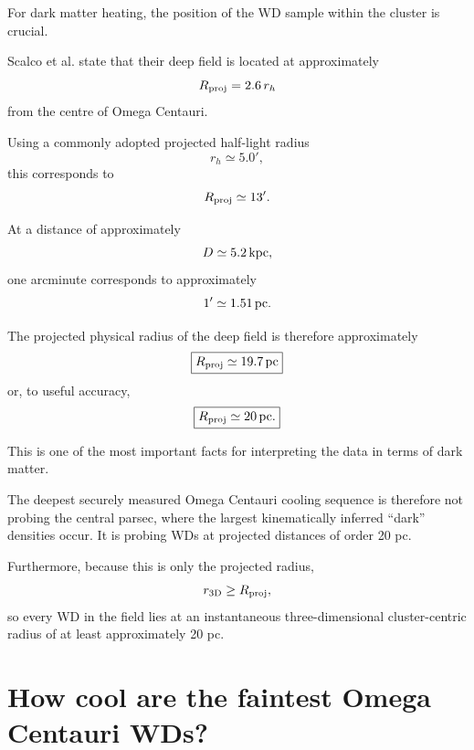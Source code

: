 \documentclass[11pt,a4paper]{article}
\begin{document}
For dark matter heating, the position of the WD sample within the cluster is crucial.

Scalco et al. state that their deep field is located at approximately
\begin{equation}
R_{\rm proj}=2.6\,r_h
\end{equation}
from the centre of Omega Centauri.

Using a commonly adopted projected half-light radius
\begin{equation}
r_h \simeq 5.0',
\end{equation}
this corresponds to
\begin{equation}
R_{\rm proj}\simeq13'.
\end{equation}

At a distance of approximately
\begin{equation}
D\simeq5.2\,{\rm kpc},
\end{equation}
one arcminute corresponds to approximately
\begin{equation}
1' \simeq 1.51\,{\rm pc}.
\end{equation}

The projected physical radius of the deep field is therefore approximately
\begin{equation}
\boxed{
R_{\rm proj}\simeq19.7\,{\rm pc}
}
\end{equation}
or, to useful accuracy,
\begin{equation}
\boxed{
R_{\rm proj}\simeq20\,{\rm pc}.
}
\end{equation}

This is one of the most important facts for interpreting the data in terms of dark matter.

The deepest securely measured Omega Centauri cooling sequence is therefore not probing the central parsec, where the largest kinematically inferred ``dark'' densities occur. It is probing WDs at projected distances of order 20 pc.

Furthermore, because this is only the projected radius,
\begin{equation}
r_{\rm 3D}\geq R_{\rm proj},
\end{equation}
so every WD in the field lies at an instantaneous three-dimensional cluster-centric radius of at least approximately 20 pc.


\section{How cool are the faintest Omega Centauri WDs?}
\end{document}
